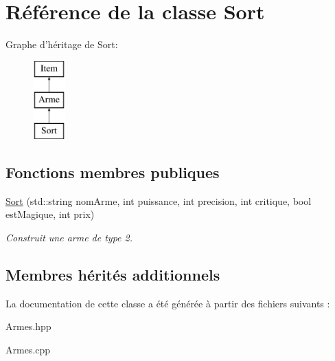 \hypertarget{classSort}{\section{Référence de la classe Sort}
\label{classSort}
}
Graphe d'héritage de Sort\-:\begin{figure}[H]
\begin{center}
\leavevmode
\includegraphics[height=3.000000cm]{classSort}
\end{center}
\end{figure}
\subsection*{Fonctions membres publiques}
\begin{DoxyCompactItemize}
\item 
\hypertarget{classSort_aa71bc58371a3504b076042269d2b9827}{\hyperlink{classSort_aa71bc58371a3504b076042269d2b9827}{Sort} (std\-::string nom\-Arme, int puissance, int precision, int critique, bool est\-Magique, int prix)}\label{classSort_aa71bc58371a3504b076042269d2b9827}

\begin{DoxyCompactList}\small\item\em Construit une arme de type 2. \end{DoxyCompactList}\end{DoxyCompactItemize}
\subsection*{Membres hérités additionnels}


La documentation de cette classe a été générée à partir des fichiers suivants \-:\begin{DoxyCompactItemize}
\item 
Armes.\-hpp\item 
Armes.\-cpp\end{DoxyCompactItemize}
